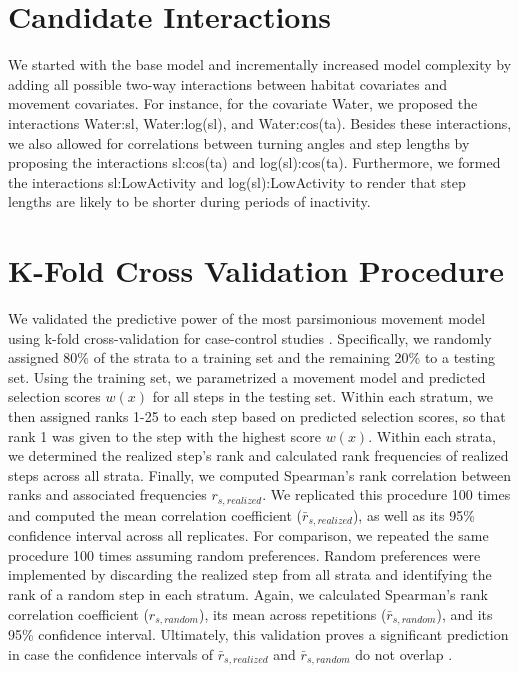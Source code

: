 \documentclass[abstract=off,10pt,a4paper,bibliography=totocnumbered]{article}
\begin{document}
\section{Candidate Interactions}
We started with the base model and incrementally increased model complexity by
adding all possible two-way interactions between habitat covariates and movement
covariates. For instance, for the covariate \textsf{Water}, we proposed the
interactions \textsf{Water:sl}, \textsf{Water:log(sl)}, and
\textsf{Water:cos(ta)}. Besides these interactions, we also allowed for
correlations between turning angles and step lengths by proposing the
interactions \textsf{sl:cos(ta)} and \textsf{log(sl):cos(ta)}. Furthermore, we
formed the interactions \textsf{sl:LowActivity} and \textsf{log(sl):LowActivity}
to render that step lengths are likely to be shorter during periods of
inactivity.

\newpage
\section{K-Fold Cross Validation Procedure}
We validated the predictive power of the most parsimonious movement model using
k-fold cross-validation for case-control studies \cite{Fortin.2009}.
Specifically, we randomly assigned 80\% of the strata to a training set and the
remaining 20\% to a testing set. Using the training set, we parametrized a
movement model and predicted selection scores \(w(x)\) for all steps in the
testing set. Within each stratum, we then assigned ranks 1-25 to each step based
on predicted selection scores, so that rank 1 was given to the step with the
highest score \(w(x)\). Within each strata, we determined the realized step's
rank and calculated rank frequencies of realized steps across all strata.
Finally, we computed Spearman's rank correlation between ranks and associated
frequencies \(r_{s, realized}\). We replicated this procedure 100 times and
computed the mean correlation coefficient (\(\bar{r}_{s, realized}\)), as well
as its 95\% confidence interval across all replicates. For comparison, we
repeated the same procedure 100 times assuming random preferences. Random
preferences were implemented by discarding the realized step from all strata and
identifying the rank of a random step in each stratum. Again, we calculated
Spearman's rank correlation coefficient (\(r_{s, random}\)), its mean across
repetitions (\(\bar{r}_{s, random}\)), and its 95\% confidence interval.
Ultimately, this validation proves a significant prediction in case the
confidence intervals of \(\bar{r}_{s, realized}\) and \(\bar{r}_{s, random}\) do
not overlap \citep{Fortin.2009}.
\end{document}
